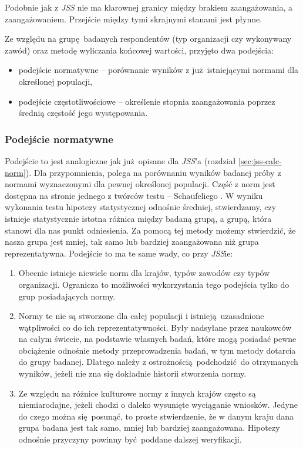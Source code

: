 Podobnie jak z \emph{JSS} nie ma klarownej granicy między brakiem zaangażowania, a zaangażowaniem. Przejście między tymi skrajnymi stanami jest płynne. 

Ze względu na grupę badanych respondentów (typ organizacji czy wykonywany zawód) oraz metodę wyliczania końcowej wartości, przyjęto dwa podejścia:
\begin{itemize}
\item podejście normatywne -- porównanie wyników z już istniejącymi normami dla określonej populacji,
\item podejście częstotliwościowe -- określenie stopnia zaangażowania poprzez średnią częstość jego występowania.
\end{itemize}
\subsubsection{Podejście normatywne}
Podejście to jest analogiczne jak już opisane dla \emph{JSS}'a (rozdział \ref{sec:jss-calc-norm}). Dla przypomnienia, polega na porównaniu wyników badanej próby z normami wyznaczonymi dla pewnej określonej populacji. Część z norm jest dostępna na stronie jednego z twórców testu -- Schaufeliego \cite{web:uwes-norms}. W wyniku wykonania testu hipotezy statystycznej odnośnie średniej, stwierdzamy, czy istnieje statystycznie istotna różnica między badaną grupą, a grupą, która stanowi
dla nas punkt odniesienia. Za pomocą tej metody możemy stwierdzić, że nasza grupa jest mniej, tak samo lub bardziej zaangażowana niż grupa reprezentatywna. Podejście to ma te same wady, co przy \emph{JSS}ie:
\begin{enumerate}
\item Obecnie istnieje niewiele norm dla krajów, typów zawodów czy typów organizacji. Ogranicza to możliwości wykorzystania tego podejścia tylko do grup posiadających normy.
\item Normy te nie są stworzone dla całej populacji i istnieją uzasadnione wątpliwości co do ich reprezentatywności. Były nadsyłane przez naukowców na całym świecie, na podstawie własnych badań, które mogą posiadać pewne obciążenie odnośnie metody przeprowadzenia badań, w tym metody dotarcia do grupy badanej. Dlatego należy z ostrożnością podchodzić do otrzymanych wyników, jeżeli nie zna się dokładnie historii stworzenia normy.
\item Ze względu na różnice kulturowe normy z innych krajów często są niemiarodajne, jeżeli chodzi o daleko wysunięte wyciąganie wniosków. Jedyne do czego można się posunąć, to proste stwierdzenie, że w danym kraju dana grupa badana jest tak samo, mniej lub bardziej zaangażowana. Hipotezy odnośnie przyczyny powinny być poddane dalszej weryfikacji.
\end{enumerate}

